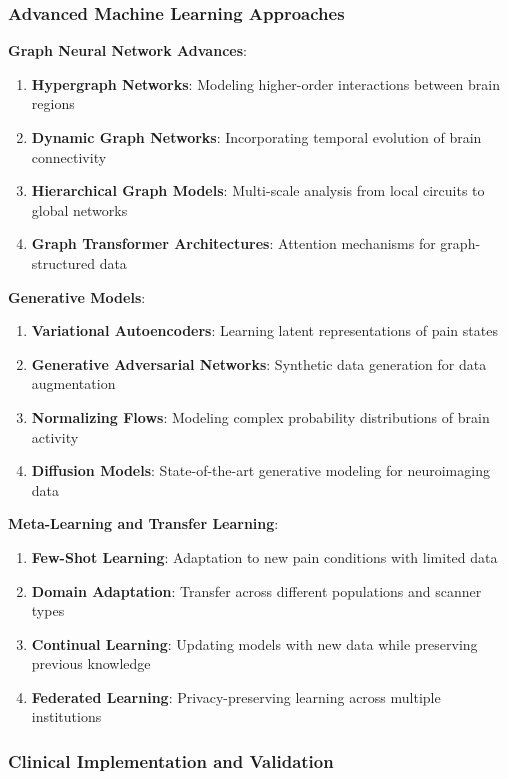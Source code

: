\documentclass[10pt,journal,compsoc]{IEEEtran}
\begin{document}
\subsubsection{Advanced Machine Learning Approaches}

\textbf{Graph Neural Network Advances}:

\begin{enumerate}
\item \textbf{Hypergraph Networks}: Modeling higher-order interactions between brain regions
\item \textbf{Dynamic Graph Networks}: Incorporating temporal evolution of brain connectivity
\item \textbf{Hierarchical Graph Models}: Multi-scale analysis from local circuits to global networks
\item \textbf{Graph Transformer Architectures}: Attention mechanisms for graph-structured data
\end{enumerate}

\textbf{Generative Models}:

\begin{enumerate}
\item \textbf{Variational Autoencoders}: Learning latent representations of pain states
\item \textbf{Generative Adversarial Networks}: Synthetic data generation for data augmentation
\item \textbf{Normalizing Flows}: Modeling complex probability distributions of brain activity
\item \textbf{Diffusion Models}: State-of-the-art generative modeling for neuroimaging data
\end{enumerate}

\textbf{Meta-Learning and Transfer Learning}:

\begin{enumerate}
\item \textbf{Few-Shot Learning}: Adaptation to new pain conditions with limited data
\item \textbf{Domain Adaptation}: Transfer across different populations and scanner types
\item \textbf{Continual Learning}: Updating models with new data while preserving previous knowledge
\item \textbf{Federated Learning}: Privacy-preserving learning across multiple institutions
\end{enumerate}

\subsubsection{Clinical Implementation and Validation}
\end{document}
